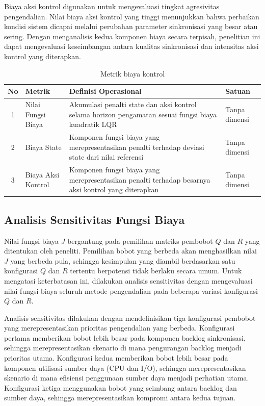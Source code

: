 Biaya aksi kontrol digunakan untuk mengevaluasi tingkat agresivitas pengendalian.
Nilai biaya aksi kontrol yang tinggi menunjukkan bahwa perbaikan kondisi sistem dicapai melalui perubahan parameter sinkronisasi yang besar atau sering.
Dengan menganalisis kedua komponen biaya secara terpisah, penelitian ini dapat mengevaluasi keseimbangan antara kualitas sinkronisasi dan intensitas aksi kontrol yang diterapkan.

\begin{table}[H]
    \centering
    \caption{Metrik biaya kontrol}
    \label{tab:metrik-biaya}
    \renewcommand{\arraystretch}{1.4}
    \begin{tabular}{|c|p{3cm}|p{6cm}|p{2.5cm}|}
    \hline
    \textbf{No} & \textbf{Metrik} & \textbf{Definisi Operasional} & \textbf{Satuan} \\
    \hline
    1 & Nilai Fungsi Biaya & Akumulasi penalti state dan aksi kontrol selama horizon pengamatan sesuai fungsi biaya kuadratik LQR & Tanpa dimensi \\
    \hline
    2 & Biaya State & Komponen fungsi biaya yang merepresentasikan penalti terhadap deviasi state dari nilai referensi & Tanpa dimensi \\
    \hline
    3 & Biaya Aksi Kontrol & Komponen fungsi biaya yang merepresentasikan penalti terhadap besarnya aksi kontrol yang diterapkan & Tanpa dimensi \\
    \hline
    \end{tabular}
\end{table}

\subsection{Analisis Sensitivitas Fungsi Biaya}

Nilai fungsi biaya $J$ bergantung pada pemilihan matriks pembobot $Q$ dan $R$ yang ditentukan oleh peneliti.
Pemilihan bobot yang berbeda akan menghasilkan nilai $J$ yang berbeda pula, sehingga kesimpulan yang diambil berdasarkan satu konfigurasi $Q$ dan $R$ tertentu berpotensi tidak berlaku secara umum.
Untuk mengatasi keterbatasan ini, dilakukan analisis sensitivitas dengan mengevaluasi nilai fungsi biaya seluruh metode pengendalian pada beberapa variasi konfigurasi $Q$ dan $R$.

Analisis sensitivitas dilakukan dengan mendefinisikan tiga konfigurasi pembobot yang merepresentasikan prioritas pengendalian yang berbeda.
Konfigurasi pertama memberikan bobot lebih besar pada komponen backlog sinkronisasi, sehingga merepresentasikan skenario di mana pengurangan backlog menjadi prioritas utama.
Konfigurasi kedua memberikan bobot lebih besar pada komponen utilisasi sumber daya (CPU dan I/O), sehingga merepresentasikan skenario di mana efisiensi penggunaan sumber daya menjadi perhatian utama.
Konfigurasi ketiga menggunakan bobot yang seimbang antara backlog dan sumber daya, sehingga merepresentasikan kompromi antara kedua tujuan.

